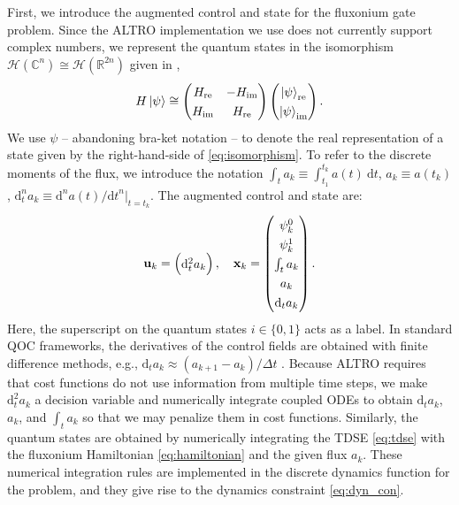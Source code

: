 \documentclass[
  amsfonts,
  amsmath,
  amssymb,
  pra,
  twocolumn,
  superscriptaddress,
]{revtex4-2}
\begin{document}
First, we introduce the augmented control and state for the fluxonium gate problem.
Since the ALTRO implementation we use does not currently
support complex numbers, we represent the quantum states
in the isomorphism $\mathcal{H}(\mathbb{C}^{n})
\cong \mathcal{H}(\mathbb{R}^{2n})$ given in \cite{leung2017speedup},
\begin{equation}
  H \ket{\psi} \cong \begin{pmatrix} H_{\textrm{re}} & -H_{\textrm{im}}
    \\ H_{\textrm{im}} & H_{\textrm{re}}\end{pmatrix}
  \begin{pmatrix} \ket{\psi}_{\textrm{re}} \\ \ket{\psi}_{\textrm{im}}\end{pmatrix}.
  \label{eq:isomorphism}
\end{equation}
We use $\psi$ -- abandoning bra-ket notation -- to denote the real representation of a state
given by the right-hand-side of \eqref{eq:isomorphism}.
To refer to the discrete moments of the flux, we introduce the notation
$\int_{t} a_{k} \equiv \int^{t_{k}}_{t_{1}} a(t) \ \mathrm{d}t$,
$a_{k} \equiv a(t_{k})$,
$\mathrm{d}^{n}_{t} a_{k} \equiv \mathrm{d}^{n}a(t)/{\mathrm{d}t}^{n} \lvert_{t = t_{k}}$.
The augmented control and state are:
\begin{equation}
  \begingroup
  \renewcommand*{\arraystretch}{1.3}
  \mathbf{u}_{k} = \begin{pmatrix} \mathrm{d}^{2}_{t} a_{k} \end{pmatrix}, \quad
  \mathbf{x}_{k} = \begin{pmatrix} \psi^{0}_{k} \\ \psi^{1}_{k}
    \\ \int_{t} a_{k} \\ a_{k} \\ \mathrm{d}_{t} a_{k} \end{pmatrix}.
  \endgroup
  \label{eq:astatecontrols}
\end{equation}
Here, the superscript on the quantum states $i \in \{0, 1\}$ acts as a label.
In standard QOC frameworks, the derivatives of the control fields
are obtained with finite difference methods, e.g.,
$\mathrm{d}_{t} a_{k} \approx (a_{k + 1} - a_{k}) / \Delta t$ \cite{leung2017speedup}.
Because ALTRO requires that cost functions do not use information from multiple time steps,
we make $\mathrm{d}^{2}_{t} a_{k}$ a decision variable and
numerically integrate coupled ODEs to obtain $\mathrm{d}_{t} a_{k}$, $a_{k}$, and $\int_{t} a_{k}$
so that we may penalize them in cost functions.
Similarly, the quantum states are obtained by numerically integrating
the TDSE \eqref{eq:tdse} with the fluxonium Hamiltonian \eqref{eq:hamiltonian}
and the given flux $a_{k}$. These numerical integration rules are implemented
in the discrete dynamics function for the problem, and they give rise to the
dynamics constraint \eqref{eq:dyn_con}.
\end{document}
